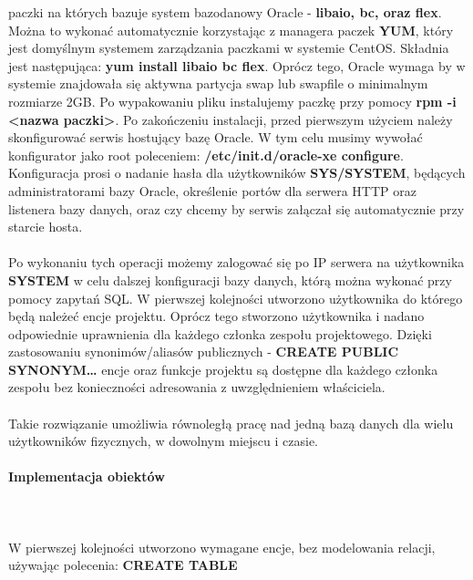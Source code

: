 \documentclass[polish, 11pt]{article}
\begin{document}
			    paczki na których bazuje system bazodanowy Oracle - {\bfseries libaio, bc, oraz flex}. Można to wykonać automatycznie
			    korzystając z managera paczek {\bfseries YUM}, który jest domyślnym systemem zarządzania paczkami w systemie CentOS.
			    Składnia jest następująca: {\bfseries yum install libaio bc flex}. Oprócz tego, Oracle wymaga by w systemie znajdowała się
			    aktywna partycja swap lub swapfile o minimalnym rozmiarze 2GB. Po wypakowaniu pliku instalujemy paczkę przy pomocy
			    {\bfseries rpm -i <nazwa paczki>}. Po zakończeniu instalacji, przed pierwszym użyciem należy skonfigurować serwis hostujący
			    bazę Oracle. W tym celu musimy wywołać konfigurator jako root poleceniem: {\bfseries /etc/init.d/oracle-xe configure}. Konfiguracja
			    prosi o nadanie hasła dla użytkowników {\bfseries SYS/SYSTEM}, będących administratorami bazy Oracle, określenie portów dla serwera
			    HTTP oraz listenera bazy danych, oraz czy chcemy by serwis załączał się automatycznie przy starcie hosta.\\\\
			    Po wykonaniu tych operacji możemy zalogować się po IP serwera na użytkownika {\bfseries SYSTEM} w celu dalszej konfiguracji bazy danych,
			    którą można wykonać przy pomocy zapytań SQL. W pierwszej kolejności utworzono użytkownika do którego będą należeć encje projektu.
			    Oprócz tego stworzono użytkownika i nadano odpowiednie uprawnienia dla każdego członka zespołu projektowego. Dzięki zastosowaniu
			    synonimów/aliasów publicznych - {\bfseries CREATE PUBLIC SYNONYM\dots} encje oraz funkcje projektu są dostępne dla każdego członka
			    zespołu bez konieczności adresowania z uwzględnieniem właściciela.\\\\ 
			    Takie rozwiązanie umożliwia równoległą pracę nad jedną bazą danych dla wielu użytkowników fizycznych, w dowolnym miejscu i czasie.
		    
		    \paragraph{Implementacja obiektów}\mbox{}\\\\
			    W pierwszej kolejności utworzono wymagane encje, bez modelowania relacji, używając polecenia: {\bfseries CREATE TABLE}\\\\
			    
			    
			    
\end{document}
